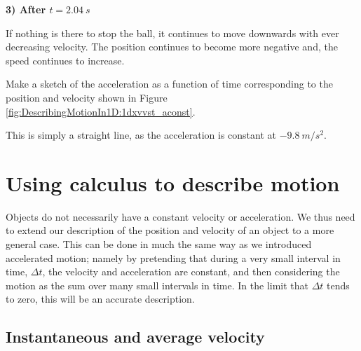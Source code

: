 \textbf{3) After $t=\SI{2.04}{s}$}

If nothing is there to stop the ball, it continues to move downwards with ever decreasing velocity. The position continues to become more negative and, the speed continues to increase.

\begin{checkpoint}{Make a sketch of the acceleration as a function of time corresponding to the position and velocity shown in Figure \ref{fig:DescribingMotionIn1D:1dxvvst_aconst}.}
\begin{answer}
This is simply a straight line, as the acceleration is constant at $\SI{-9.8}{m/s^2}$.
\end{answer}
\end{checkpoint}

\section{Using calculus to describe motion}
Objects do not necessarily have a constant velocity or acceleration. We thus need to extend our description of the position and velocity of an object to a more general case. This can be done in much the same way as we introduced accelerated motion; namely by pretending that during a very small interval in time, $\Delta t$, the velocity and acceleration are constant, and then considering the motion as the sum over many small intervals in time. In the limit that $\Delta t$ tends to zero, this will be an accurate description. 

\subsection{Instantaneous and average velocity}

